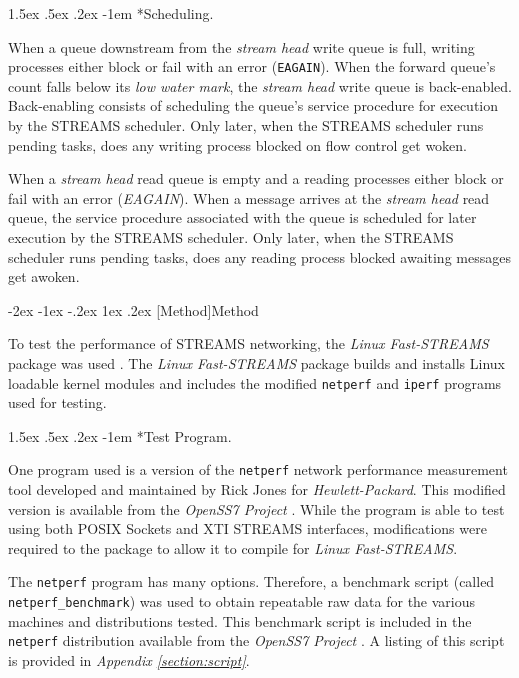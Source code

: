 \documentclass[letterpaper,final,notitlepage,twocolumn,10pt,twoside]{article}
\makeatletter
\renewcommand\section{\@startsection {section}{1}{\z@}%
                                   {-2ex \@plus -1ex \@minus -.2ex}%
                                   {1ex \@plus .2ex}%
                                   {\normalfont\large\bfseries}}
\renewcommand\paragraph{\@startsection{paragraph}{4}{\z@}%
                                    {1.5ex \@plus .5ex \@minus .2ex}%
                                    {-1em}%
                                    {\normalfont\normalsize\bfseries\slshape}}
\makeatother
\begin{document}
\paragraph*{Scheduling.}

When a queue downstream from the \textit{stream head} write queue is full,
writing processes either block or fail with an error (\texttt{EAGAIN}).  When
the forward queue's count falls below its \textit{low water mark}, the
\textit{stream head} write queue is back-enabled.  Back-enabling consists of
scheduling the queue's service procedure for execution by the STREAMS
scheduler.  Only later, when the STREAMS scheduler runs pending tasks, does
any writing process blocked on flow control get woken.

When a \textit{stream head} read queue is empty and a reading processes either
block or fail with an error (\textit{EAGAIN}).  When a message arrives at the
\textit{stream head} read queue, the service procedure associated with the
queue is scheduled for later execution by the STREAMS scheduler.  Only later,
when the STREAMS scheduler runs pending tasks, does any reading process
blocked awaiting messages get awoken.

\section[Method]{Method}

To test the performance of STREAMS networking, the \textsl{Linux Fast-STREAMS}
package was used \cite[]{LfS}.  The \textsl{Linux Fast-STREAMS} package builds
and installs Linux loadable kernel modules and includes the modified
\texttt{netperf} and \texttt{iperf} programs used for testing.

\paragraph*{Test Program.}

One program used is a version of the \texttt{netperf} network performance
measurement tool developed and maintained by Rick Jones for
\textit{Hewlett-Packard}.  This modified version is available from the
\textit{OpenSS7 Project} \cite[]{netperf}.  While the program is able to test
using both POSIX Sockets and XTI STREAMS interfaces, modifications were
required to the package to allow it to compile for \textsl{Linux
Fast-STREAMS}.

The \texttt{netperf} program has many options.  Therefore, a benchmark script
(called \texttt{netperf\_benchmark}) was used to obtain repeatable raw data
for the various machines and distributions tested.  This benchmark script is
included in the \texttt{netperf} distribution available from the
\textit{OpenSS7 Project} \cite[]{netperf}.  A listing of this script is
provided in \textit{Appendix \ref{section:script}}.
\end{document}
